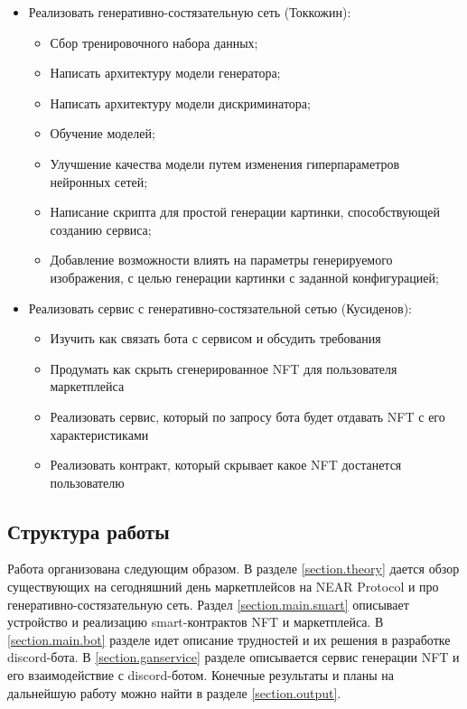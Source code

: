 \begin{itemize}
    \item Реализовать генеративно-состязательную сеть (Токкожин):
    \begin{itemize}
        \item Сбор тренировочного набора данных;
        \item Написать архитектуру модели генератора;
        \item Написать архитектуру модели дискриминатора;
        \item Обучение моделей;
        \item Улучшение качества модели путем изменения гиперпараметров нейронных сетей;
        \item Написание скрипта для простой генерации картинки, способствующей созданию сервиса;
        \item Добавление возможности влиять на параметры генерируемого изображения, с целью генерации картинки с заданной конфигурацией;
    \end{itemize}
        \item Реализовать сервис с генеративно-состязательной сетью (Кусиденов):
    \begin{itemize}
    	\item Изучить как связать бота с сервисом и обсудить требования
    	\item Продумать как скрыть сгенерированное NFT для пользователя маркетплейса
    	\item Реализовать сервис, который по запросу бота будет отдавать NFT с его характеристиками
    	\item Реализовать контракт, который скрывает какое NFT достанется пользователю
    \end{itemize}
\end{itemize}

\subsection{Структура работы}

Работа организована следующим образом. В разделе {\color{blue} \ref{section.theory}} дается обзор существующих на сегодняшний день маркетплейсов на NEAR Protocol и про генеративно-состязательную сеть. Раздел {\color{blue} \ref{section.main.smart}} описывает устройство и реализацию smart-контрактов NFT и маркетплейса. В {\color{blue} \ref{section.main.bot}} разделе идет описание трудностей и их решения в разработке discord-бота. В {\color{blue} \ref{section.ganservice}} разделе описывается сервис генерации NFT и его взаимодействие с discord-ботом.
Конечные результаты и планы на дальнейшую работу можно найти в разделе {\color{blue} \ref{section.output}}.
